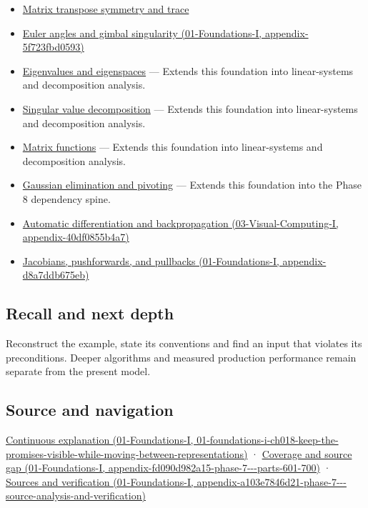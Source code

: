 \begin{itemize}
\item
  \hyperref[appendix-175ca5ff874d]{Matrix transpose symmetry and trace}
\item
  \href{../01-Foundations-I/main.pdf\#nameddest=appendix-5f723fbd0593}{Euler angles and gimbal singularity (01-Foundations-I, appendix-5f723fbd0593)}
\item
  \hyperref[appendix-0b3be18411f9]{Eigenvalues and eigenspaces} --- Extends this foundation into linear-systems and decomposition analysis.
\item
  \hyperref[appendix-1fad5e7f36fa]{Singular value decomposition} --- Extends this foundation into linear-systems and decomposition analysis.
\item
  \hyperref[appendix-0f4bc2bf2b1f]{Matrix functions} --- Extends this foundation into linear-systems and decomposition analysis.
\item
  \hyperref[appendix-f6e77f4a200f]{Gaussian elimination and pivoting} --- Extends this foundation into the Phase 8 dependency spine.
\item
  \href{../03-Visual-Computing-I/main.pdf\#nameddest=appendix-40df0855b4a7}{Automatic differentiation and backpropagation (03-Visual-Computing-I, appendix-40df0855b4a7)}
\item
  \href{../01-Foundations-I/main.pdf\#nameddest=appendix-d8a7ddb675eb}{Jacobians, pushforwards, and pullbacks (01-Foundations-I, appendix-d8a7ddb675eb)}
\end{itemize}

\subsection{Recall and next depth}\label{appendix-ab31ef447dbf-recall-and-next-depth}

Reconstruct the example, state its conventions and find an input that violates its preconditions. Deeper algorithms and measured production performance remain separate from the present model.

\subsection{Source and navigation}\label{appendix-ab31ef447dbf-source-and-navigation}

\href{../01-Foundations-I/main.pdf\#nameddest=01-foundations-i-ch018-keep-the-promises-visible-while-moving-between-representations}{Continuous explanation (01-Foundations-I, 01-foundations-i-ch018-keep-the-promises-visible-while-moving-between-representations)} · \href{../01-Foundations-I/main.pdf\#nameddest=appendix-fd090d982a15-phase-7---parts-601-700}{Coverage and source gap (01-Foundations-I, appendix-fd090d982a15-phase-7-\/-\/-parts-601-700)} · \href{../01-Foundations-I/main.pdf\#nameddest=appendix-a103e7846d21-phase-7---source-analysis-and-verification}{Sources and verification (01-Foundations-I, appendix-a103e7846d21-phase-7-\/-\/-source-analysis-and-verification)}

